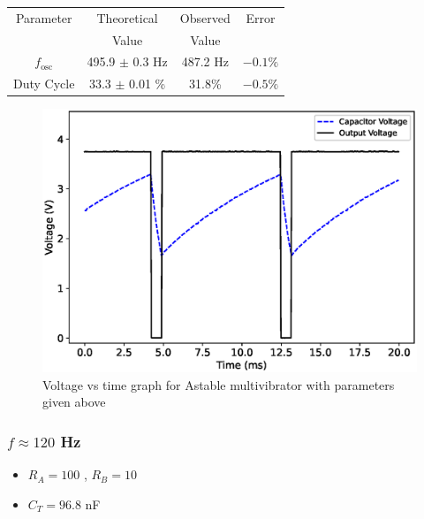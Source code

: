 \begin{table}[H]
    \centering
    \begin{tabular}{|c|c|c|c|}\hline
        Parameter & Theoretical & Observed & Error \\ 
        & Value       & Value    &       \\ \hline 
        $f_\text{osc}$   & 495.9 $\pm$ 0.3 Hz & 487.2 Hz & $-0.1\%$  \\ \hline
        Duty Cycle       & 33.3 $\pm$ 0.01 \% & 31.8\%  & $-0.5\%$ \\ \hline
    \end{tabular}
\end{table}
\begin{figure}[H]
    \centering
    \includegraphics[width=0.9\columnwidth]{images/5552.eps}
    \caption{Voltage vs time graph for Astable multivibrator with parameters given above}
\end{figure}

\subsubsection{$f \approx 120$ Hz}
\begin{itemize}
    \item $R_A=100$ \kohm, $R_B=10$ \kohm
    \item $C_T=96.8$ nF
\end{itemize}

